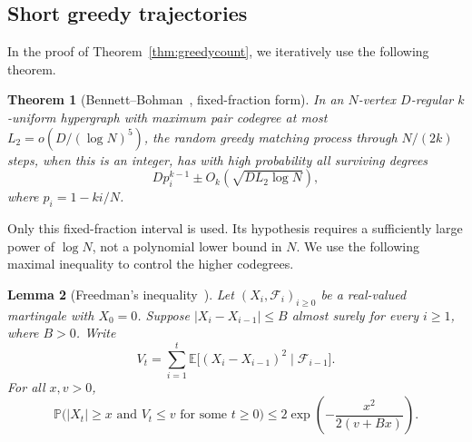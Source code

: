 \documentclass[11pt,reqno]{amsart}
\numberwithin{equation}{section}
\theoremstyle{plain}
\newtheorem{theorem}{Theorem}[section]
\newtheorem{lemma}[theorem]{Lemma}
\theoremstyle{definition}
\newcommand{\E}{\mathbb E}
\newcommand{\Prob}{\mathbb P}
\begin{document}

\subsection{Short greedy trajectories}\label{subsec:shortgreedy}
In the proof of Theorem~\ref{thm:greedycount}, we iteratively use the following theorem. 

\begin{theorem}[Bennett--Bohman~{\cite[Theorem~2.1]{BB}}, fixed-fraction form]\label{thm:BB}
    In an $N$-vertex $D$-regular $k$-uniform hypergraph with maximum pair codegree at most $L_2=o(D/(\log N)^5)$, the random greedy matching process through $N/(2k)$ steps, when this is an integer, has with high probability all surviving degrees
    \begin{equation*}
        Dp_i^{k-1}\pm O_k(\sqrt{DL_2\log N}),
    \end{equation*}
    where $p_i=1-ki/N$.
\end{theorem}
Only this fixed-fraction interval is used.
Its hypothesis requires a sufficiently large power of $\log N$, not a polynomial lower bound in $N$.
We use the following maximal inequality to control the higher codegrees.

\begin{lemma}[Freedman's inequality~\cite{Freedman}]\label{lem:freedman}
    Let $(X_i,\mathcal F_i)_{i\ge0}$ be a real-valued martingale with $X_0=0$.
    Suppose $|X_i-X_{i-1}|\le B$ almost surely for every $i\ge1$, where $B>0$.
    Write
    \[
        V_t=\sum_{i=1}^t\E\bigl[(X_i-X_{i-1})^2\mid\mathcal F_{i-1}\bigr].
    \]
    For all $x,v>0$,
    \[
        \Prob\bigl(|X_t|\ge x\text{ and }V_t\le v\text{ for some }t\ge0\bigr)
        \le2\exp\left(-\frac{x^2}{2(v+Bx)}\right).
    \]
\end{lemma}
\end{document}
